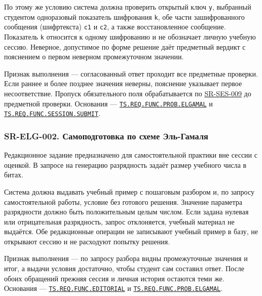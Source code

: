 \documentclass[12pt,a4paper]{article}
\begin{document}
По этому же условию система должна проверить открытый ключ \texttt{y}, выбранный студентом одноразовый показатель шифрования \texttt{k}, обе части зашифрованного сообщения (шифртекста) \texttt{c1} и \texttt{c2}, а также восстановленное сообщение. Показатель \texttt{k} относится к одному шифрованию и не обозначает личную учебную сессию. Неверное, допустимое по форме решение даёт предметный вердикт с пояснением о первом неверном промежуточном значении.

Признак выполнения --- согласованный ответ проходит все предметные проверки. Если раннее и более позднее значения неверны, пояснение указывает первое несоответствие. Пропуск обязательного поля обрабатывается по {\hyperlink{sr-ses-009}{SR-SES-009}} до предметной проверки. Основания --- {\href{../02\_Техническое\_задание/DOC-02\_Техническое\_задание.pdf\#ts-req-func-prob-elgamal}{\texttt{TS.\allowbreak{}REQ.\allowbreak{}FUNC.\allowbreak{}PROB.\allowbreak{}ELGAMAL}}} и {\href{../02\_Техническое\_задание/DOC-02\_Техническое\_задание.pdf\#ts-req-func-session-submit}{\texttt{TS.\allowbreak{}REQ.\allowbreak{}FUNC.\allowbreak{}SESSION.\allowbreak{}SUBMIT}}}.

\subsubsection{SR-ELG-002. Самоподготовка по схеме Эль-Гамаля}\label{sr-elg-002-ux441ux430ux43cux43eux43fux43eux434ux433ux43eux442ux43eux432ux43aux430-ux43fux43e-ux441ux445ux435ux43cux435-ux44dux43bux44c-ux433ux430ux43cux430ux43bux44f}

\hypertarget{sr-elg-002-самоподготовка-по-схеме-эль-гамаля}{}

\hypertarget{sr-elg-002}{}

Редакционное задание предназначено для самостоятельной практики вне сессии с оценкой. В запросе на генерацию разрядность задаёт размер учебного числа в битах.

Система должна выдавать учебный пример с пошаговым разбором и, по запросу самостоятельной работы, условие без готового решения. Значение параметра разрядности должно быть положительным целым числом. Если задана нулевая или отрицательная разрядность, запрос отклоняется, учебный материал не выдаётся. Обе редакционные операции не записывают учебный пример в базу, не открывают сессию и не расходуют попытку решения.

Признак выполнения --- по запросу разбора видны промежуточные значения и итог, а выдачи условия достаточно, чтобы студент сам составил ответ. После обоих обращений прежняя сессия и личная история остаются теми же. Основания --- {\href{../02\_Техническое\_задание/DOC-02\_Техническое\_задание.pdf\#ts-req-func-editorial}{\texttt{TS.\allowbreak{}REQ.\allowbreak{}FUNC.\allowbreak{}EDITORIAL}}} и {\href{../02\_Техническое\_задание/DOC-02\_Техническое\_задание.pdf\#ts-req-func-prob-elgamal}{\texttt{TS.\allowbreak{}REQ.\allowbreak{}FUNC.\allowbreak{}PROB.\allowbreak{}ELGAMAL}}}.
\end{document}
